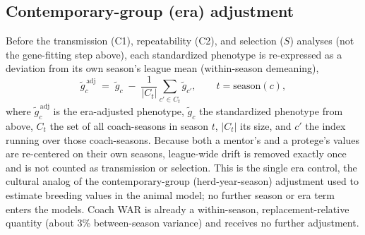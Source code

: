 \documentclass[
  journal=ehs,
  manuscript=article,
  year=2026,
  volume=8,
]{cup-journal}
\begin{document}
\subsection{Contemporary-group (era) adjustment}
Before the transmission (C1), repeatability (C2), and selection ($S$) analyses (not
the gene-fitting step above), each standardized phenotype is re-expressed as a
deviation from its own season's league mean (within-season demeaning),
\begin{equation}
  \tilde{g}_c^{\,\mathrm{adj}} \;=\; \tilde{g}_c \;-\;
    \frac{1}{|C_t|}\sum_{c'\in C_t}\tilde{g}_{c'}, \qquad t = \mathrm{season}(c),
\end{equation}
where $\tilde{g}_c^{\,\mathrm{adj}}$ is the era-adjusted phenotype, $\tilde{g}_c$ the
standardized phenotype from above, $C_t$ the set of all coach-seasons in season $t$,
$|C_t|$ its size, and $c'$ the index running over those coach-seasons. Because both a
mentor's and
a protege's values are re-centered on their own seasons, league-wide drift is removed
exactly once and is not counted as transmission or selection. This is the single
era control, the cultural analog of the contemporary-group (herd-year-season)
adjustment used to estimate breeding values in the animal model; no further season
or era term enters the models. Coach WAR is already a within-season,
replacement-relative quantity (about 3\% between-season variance) and receives no
further adjustment.
\end{document}
